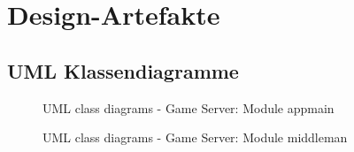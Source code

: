 \documentclass[11pt,ngerman]{article}
\begin{document}
    \section{Design-Artefakte}

        \subsection{UML Klassendiagramme}


            \begin{figure}[H]
                \centering
                \caption{UML class diagrams - Game Server: Module appmain}
                \label{fig:UMLclassdiagram_Moduleappmain}
            \end{figure}
            \begin{figure}[H]
                \centering
                \caption{UML class diagrams - Game Server: Module middleman}
                \label{fig:UMLclassdiagram_Modulemiddleman}
            \end{figure}
            \newpage
\end{document}
